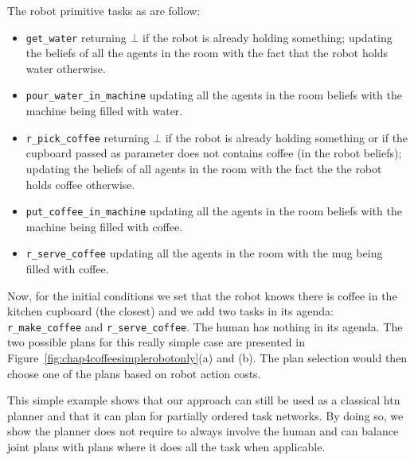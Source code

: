 \documentclass[a4paper,11pt,twoside]{StyleThese}
\begin{document}
The robot primitive tasks as are follow:
\begin{itemize}
\item \verb'get_water' returning $\bot$ if the robot is already holding something; updating the beliefs of all the agents in the room with the fact that the robot holds water otherwise.
\item \verb'pour_water_in_machine' updating all the agents in the room beliefs with the machine being filled with water.
\item \verb'r_pick_coffee' returning $\bot$ if the robot is already holding something or if the cupboard passed as parameter does not contains coffee (in the robot beliefs); updating the beliefs of all agents in the room with the fact the the robot holds coffee otherwise.
\item \verb'put_coffee_in_machine' updating all the agents in the room beliefs with the machine being filled with coffee.
\item \verb'r_serve_coffee' updating all the agents in the room with the mug being filled with coffee.
\end{itemize}

Now, for the initial conditions we set that the robot knows there is coffee in the kitchen cupboard (the closest) and we add two tasks in its agenda: \verb'r_make_coffee' and \verb'r_serve_coffee'. The human has nothing in its agenda. The two possible plans for this really simple case are presented in Figure~\ref{fig:chap4coffeesimplerobotonly}(a) and (b). The plan selection would then choose one of the plans based on robot action costs.

This simple example shows that our approach can still be used as a classical \acrshort{htn} planner and that it can plan for partially ordered task networks. By doing so, we show the planner does not require to always involve the human and can balance joint plans with plans where it does all the task when applicable.
\end{document}
